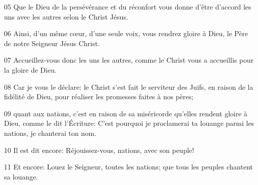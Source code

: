 
05 Que le Dieu de la persévérance et du réconfort vous donne d’être d’accord les uns avec les autres selon le Christ Jésus.

06 Ainsi, d’un même cœur, d’une seule voix, vous rendrez gloire à Dieu, le Père de notre Seigneur Jésus Christ.

07 Accueillez-vous donc les uns les autres, comme le Christ vous a accueillis pour la gloire de Dieu.

08 Car je vous le déclare: le Christ s’est fait le serviteur des Juifs, en raison de la fidélité de Dieu, pour réaliser les promesses faites à nos pères;

09 quant aux nations, c'est en raison de sa miséricorde qu'elles rendent gloire à Dieu, comme le dit l’Écriture: C’est pourquoi je proclamerai ta louange parmi les nations, je chanterai ton nom.

10 Il est dit encore: Réjouissez-vous, nations, avec son peuple!

11 Et encore: Louez le Seigneur, toutes les nations; que tous les peuples chantent sa louange.

